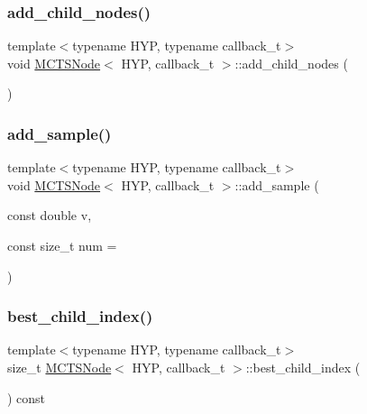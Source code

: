 \subsubsection{\texorpdfstring{add\+\_\+child\+\_\+nodes()}{add\_child\_nodes()}}
{\footnotesize\ttfamily template$<$typename H\+YP, typename callback\+\_\+t$>$ \\
void \hyperlink{class_m_c_t_s_node}{M\+C\+T\+S\+Node}$<$ H\+YP, callback\+\_\+t $>$\+::add\+\_\+child\+\_\+nodes (\begin{DoxyParamCaption}{ }\end{DoxyParamCaption})\hspace{0.3cm}{\ttfamily [inline]}}

\mbox{\label{class_m_c_t_s_node_abf621592d6d9add273696fa2b7cce9f1}} 
\subsubsection{\texorpdfstring{add\+\_\+sample()}{add\_sample()}}
{\footnotesize\ttfamily template$<$typename H\+YP, typename callback\+\_\+t$>$ \\
void \hyperlink{class_m_c_t_s_node}{M\+C\+T\+S\+Node}$<$ H\+YP, callback\+\_\+t $>$\+::add\+\_\+sample (\begin{DoxyParamCaption}\item[{const double}]{v,  }\item[{const size\+\_\+t}]{num = {} }\end{DoxyParamCaption})\hspace{0.3cm}{\ttfamily [inline]}}

\mbox{\label{class_m_c_t_s_node_af2b12868a41dcce77a34283be4baf4fa}} 
\subsubsection{\texorpdfstring{best\+\_\+child\+\_\+index()}{best\_child\_index()}}
{\footnotesize\ttfamily template$<$typename H\+YP, typename callback\+\_\+t$>$ \\
size\+\_\+t \hyperlink{class_m_c_t_s_node}{M\+C\+T\+S\+Node}$<$ H\+YP, callback\+\_\+t $>$\+::best\+\_\+child\+\_\+index (\begin{DoxyParamCaption}{ }\end{DoxyParamCaption}) const\hspace{0.3cm}{\ttfamily [inline]}}

